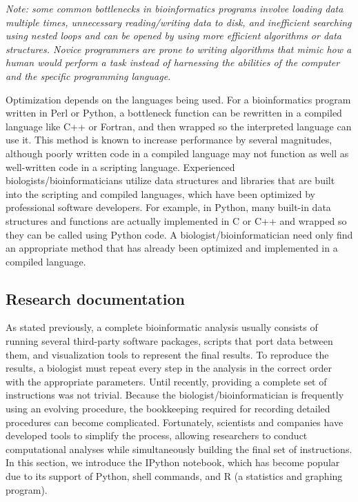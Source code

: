 \documentclass[ChapterTOCs,krantz2]{krantz} %
\begin{document}
\textsl{Note: some common bottlenecks in bioinformatics programs involve 
loading data multiple times, unnecessary reading/writing data to disk, 
and inefficient searching using nested loops and can be opened 
by using more efficient algorithms or data structures.  
Novice programmers are prone to writing algorithms that 
mimic how a human would perform a task instead of 
harnessing the abilities of the computer 
and the specific programming language.}

Optimization depends on the
languages being used. For a bioinformatics program written in Perl or Python, a
bottleneck function can be rewritten in a compiled language like C++ or
Fortran, and then wrapped so the interpreted language can use it.  This method is
known to increase performance by several magnitudes,
although poorly written code in a compiled language may not function as well as
well-written code in a scripting language.  Experienced
biologists/bioinformaticians utilize data structures and libraries that are
built into the scripting and compiled languages, which have been optimized by
professional software developers.  For example, in Python, many built-in data
structures and functions are actually implemented in C or C++ and wrapped so
they can be called using Python code.  A biologist/bioinformatician need only 
find an appropriate method that has already
been optimized and implemented in a compiled language.  

\subsection{Research documentation}

As stated previously, a complete bioinformatic analysis usually
consists of running several third-party software packages, scripts that port
data between them, and visualization tools to represent the final
results.  To reproduce the results, a biologist must
repeat every step in the analysis in the correct order with the appropriate
parameters. Until recently, providing a
complete set of instructions was not trivial.
Because the biologist/bioinformatician is frequently using an evolving
procedure, the bookkeeping required for recording detailed procedures
can become complicated.
Fortunately, scientists and companies have developed tools to simplify
the process, allowing researchers to conduct computational analyses while
simultaneously building the final set of instructions. 
In this section, we introduce the IPython notebook, which has become
popular due to its support of Python, shell commands, and R (a
statistics and graphing program). 
 
\end{document}
